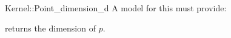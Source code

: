 \begin{ccRefFunctionObjectConcept}{Kernel::Point_dimension_d}
A model for this must provide:


 {returns the dimension of $p$.}

\end{ccRefFunctionObjectConcept}
